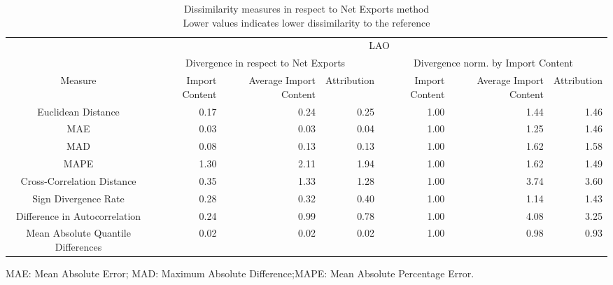 \begin{table}[t]
\caption*{
{\large Dissimilarity measures in respect to Net Exports method} \\ 
{\small Lower values indicates lower dissimilarity to the reference}
} 
\fontsize{15.0pt}{18.0pt}\selectfont
\begin{tabular*}{\linewidth}{@{\extracolsep{\fill}}crrrrrr}
\toprule
 & \multicolumn{6}{c}{LAO} \\ 
\cmidrule(lr){2-7}
 & \multicolumn{3}{c}{Divergence in respect to Net Exports} & \multicolumn{3}{c}{Divergence norm. by Import Content} \\ 
\cmidrule(lr){2-4} \cmidrule(lr){5-7}
Measure & Import Content & Average Import Content & Attribution & Import Content & Average Import Content & Attribution \\ 
\midrule\addlinespace[2.5pt]
Euclidean Distance & 0.17 & 0.24 & 0.25 & 1.00 & 1.44 & 1.46 \\ 
MAE & 0.03 & 0.03 & 0.04 & 1.00 & 1.25 & 1.46 \\ 
MAD & 0.08 & 0.13 & 0.13 & 1.00 & 1.62 & 1.58 \\ 
MAPE & 1.30 & 2.11 & 1.94 & 1.00 & 1.62 & 1.49 \\ 
Cross-Correlation Distance & 0.35 & 1.33 & 1.28 & 1.00 & 3.74 & 3.60 \\ 
Sign Divergence Rate & 0.28 & 0.32 & 0.40 & 1.00 & 1.14 & 1.43 \\ 
Difference in Autocorrelation & 0.24 & 0.99 & 0.78 & 1.00 & 4.08 & 3.25 \\ 
Mean Absolute Quantile Differences & 0.02 & 0.02 & 0.02 & 1.00 & 0.98 & 0.93 \\ 
\bottomrule
\end{tabular*}
\begin{minipage}{\linewidth}
MAE: Mean Absolute Error; MAD: Maximum Absolute Difference;MAPE: Mean Absolute Percentage Error.\\
\end{minipage}
\end{table}

